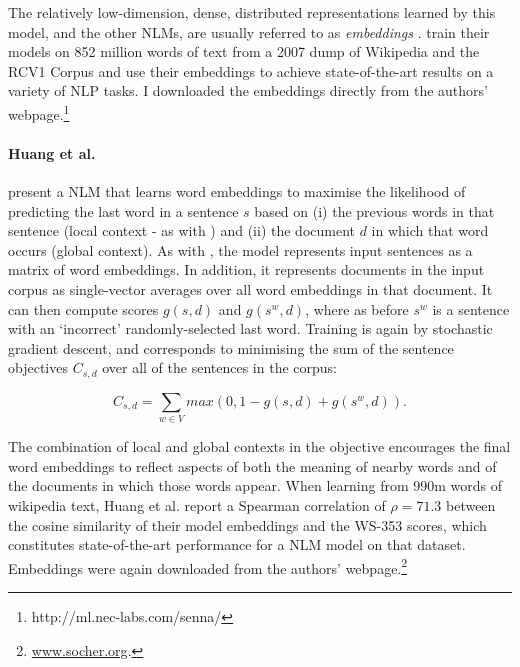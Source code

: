 The relatively low-dimension, dense, distributed representations learned by this model, and the other NLMs, are usually referred to as \emph{embeddings} \citep{turian2010word}. \cite{collobert2008unified} train their models on 852 million words of text from a 2007 dump of Wikipedia and the RCV1 Corpus \citep{lewis2004rcv1} and use their embeddings to achieve state-of-the-art results on a variety of NLP tasks. I downloaded the embeddings directly from the authors' webpage.\footnote{http://ml.nec-labs.com/senna/}

 \paragraph{\bf Huang et al.}

\cite{huang2012improving} present a NLM that learns word embeddings to maximise the likelihood of predicting the last word in a sentence \(s\) based on (i) the previous words in that sentence (local context - as with \cite{collobert2008unified}) and (ii) the document \( d\) in which that word occurs (global context). As with \cite{collobert2008unified}, the model represents input sentences as a matrix of word embeddings. In addition, it represents documents in the input corpus as single-vector averages over all word embeddings in that document. It can then compute scores \(g(s,d )\) and \(g(s^w, d) \), where as before \(s^w\) is a sentence with an `incorrect' randomly-selected last word. Training is again by stochastic gradient descent, and corresponds to minimising the sum of the sentence objectives \(C_{s,d} \) over all of the sentences in the corpus:

\[ C_{s,d}  = \sum_{w \in V} max(0,1-g(s,d) + g(s^w,d)). \]

The combination of local and global contexts in the objective encourages the final word embeddings to reflect aspects of both the meaning of nearby words and of the documents in which those words appear. When learning from 990m words of wikipedia text, Huang et al. report a Spearman correlation of \(\rho = 71.3\) between the cosine similarity of their model embeddings and the WS-353 scores, which constitutes state-of-the-art performance for a NLM model on that dataset. Embeddings were again downloaded from the authors' webpage.\footnote{\url{www.socher.org}.}

